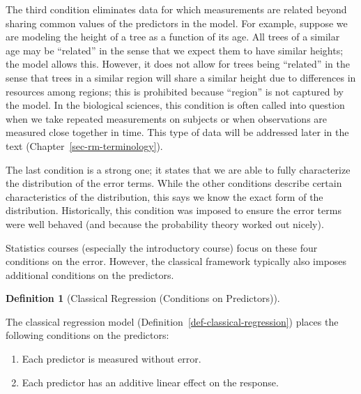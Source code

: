 \documentclass[
  letterpaper,
  DIV=11,
  numbers=noendperiod]{scrreprt}
\providecommand{\tightlist}{%
  \setlength{\itemsep}{0pt}\setlength{\parskip}{0pt}}\usepackage{longtable,booktabs,array}
\theoremstyle{definition}
\newtheorem{definition}{Definition}[chapter]
\theoremstyle{definition}
\theoremstyle{remark}
\begin{document}
The third condition eliminates data for which measurements are related
beyond sharing common values of the predictors in the model. For
example, suppose we are modeling the height of a tree as a function of
its age. All trees of a similar age may be ``related'' in the sense that
we expect them to have similar heights; the model allows this. However,
it does not allow for trees being ``related'' in the sense that trees in
a similar region will share a similar height due to differences in
resources among regions; this is prohibited because ``region'' is not
captured by the model. In the biological sciences, this condition is
often called into question when we take repeated measurements on
subjects or when observations are measured close together in time. This
type of data will be addressed later in the text
(Chapter~\ref{sec-rm-terminology}).

The last condition is a strong one; it states that we are able to fully
characterize the distribution of the error terms. While the other
conditions describe certain characteristics of the distribution, this
says we know the exact form of the distribution. Historically, this
condition was imposed to ensure the error terms were well behaved (and
because the probability theory worked out nicely).

Statistics courses (especially the introductory course) focus on these
four conditions on the error. However, the classical framework typically
also imposes additional conditions on the predictors.

\begin{definition}[Classical Regression (Conditions on
Predictors)]\protect\hypertarget{def-classical-regression-cont}{}\label{def-classical-regression-cont}

The classical regression model
(Definition~\ref{def-classical-regression}) places the following
conditions on the predictors:

\begin{enumerate}
\def\labelenumi{\arabic{enumi}.}
\tightlist
\item
  Each predictor is measured without error.
\item
  Each predictor has an additive linear effect on the response.
\end{enumerate}

\end{definition}
\end{document}
